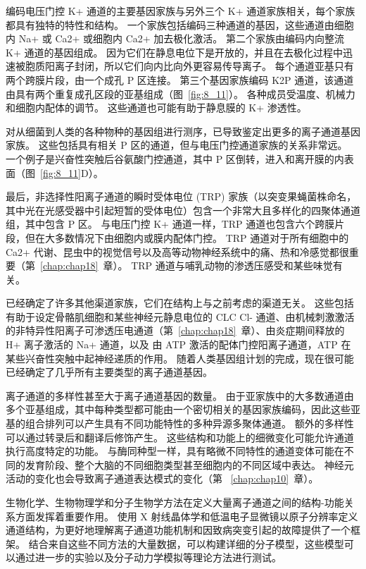 编码电压门控 K+ 通道的主要基因家族与另外三个 K+ 通道家族相关，每个家族都具有独特的特性和结构。
一个家族包括编码三种通道的基因，这些通道由细胞内 Na+ 或 Ca2+ 或细胞内 Ca2+ 加去极化激活。
第二个家族由编码内向整流 K+ 通道的基因组成。
因为它们在静息电位下是开放的，并且在去极化过程中迅速被胞质阳离子封闭，所以它们向内比向外更容易传导离子。
每个通道亚基只有两个跨膜片段，由一个成孔 P 区连接。
第三个基因家族编码 K2P 通道，该通道由具有两个重复成孔区段的亚基组成（图~\ref{fig:8_11}）。
各种成员受温度、机械力和细胞内配体的调节。
这些通道也可能有助于静息膜的 K+ 渗透性。


对从细菌到人类的各种物种的基因组进行测序，已导致鉴定出更多的离子通道基因家族。
这些包括具有相关 P 区的通道，但与电压门控通道家族的关系非常远。
一个例子是兴奋性突触后谷氨酸门控通道，其中 P 区倒转，进入和离开膜的内表面（图~\ref{fig:8_11}D）。


最后，非选择性阳离子通道的瞬时受体电位 (TRP) 家族（以突变果蝇菌株命名，其中光在光感受器中引起短暂的受体电位）包含一个非常大且多样化的四聚体通道组，其中包含 P 区。
与电压门控 K+ 通道一样，TRP 通道也包含六个跨膜片段，但在大多数情况下由细胞内或膜内配体门控。
TRP 通道对于所有细胞中的 Ca2+ 代谢、昆虫中的视觉信号以及高等动物神经系统中的痛、热和冷感觉都很重要（第~\ref{chap:chap18}~章）。
TRP 通道与哺乳动物的渗透压感受和某些味觉有关。


已经确定了许多其他渠道家族，它们在结构上与之前考虑的渠道无关。
这些包括有助于设定骨骼肌细胞和某些神经元静息电位的 CLC Cl- 通道、由机械刺激激活的非特异性阳离子可渗透压电通道（第~\ref{chap:chap18}~章）、由炎症期间释放的 H+ 离子激活的 Na+ 通道，以及 由 ATP 激活的配体门控阳离子通道，ATP 在某些兴奋性突触中起神经递质的作用。
随着人类基因组计划的完成，现在很可能已经确定了几乎所有主要类型的离子通道基因。


离子通道的多样性甚至大于离子通道基因的数量。
由于亚家族中的大多数通道由多个亚基组成，其中每种类型都可能由一个密切相关的基因家族编码，因此这些亚基的组合排列可以产生具有不同功能特性的多种异源多聚体通道。
额外的多样性可以通过转录后和翻译后修饰产生。
这些结构和功能上的细微变化可能允许通道执行高度特定的功能。
与酶同种型一样，具有略微不同特性的通道变体可能在不同的发育阶段、整个大脑的不同细胞类型甚至细胞内的不同区域中表达。
神经元活动的变化也会导致离子通道表达模式的变化（第 ~\ref{chap:chap10}~章）。


生物化学、生物物理学和分子生物学方法在定义大量离子通道之间的结构-功能关系方面发挥着重要作用。
使用 X 射线晶体学和低温电子显微镜以原子分辨率定义通道结构，为更好地理解离子通道功能机制和因致病突变引起的故障提供了一个框架。
结合来自这些不同方法的大量数据，可以构建详细的分子模型，这些模型可以通过进一步的实验以及分子动力学模拟等理论方法进行测试。





